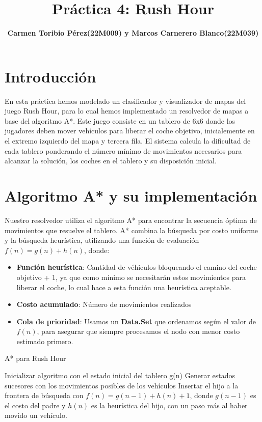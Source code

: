 \documentclass{article}
\title{ \textbf{Práctica 4: Rush Hour} }
\author{ \textbf{Carmen Toribio Pérez(22M009) y Marcos Carnerero Blanco(22M039)} }
\date{}
\begin{document}
\maketitle

\section*{Introducción}
En esta práctica hemos modelado un clasificador y visualizador de mapas del juego Rush Hour, para lo cual hemos implementado un resolvedor de mapas a base del algoritmo A*. Este juego consiste en un tablero de 6x6 donde los jugadores deben mover vehículos para liberar el coche objetivo, inicialemente en el extremo izquierdo del mapa y tercera fila. El sistema calcula la dificultad de cada tablero ponderando el número mínimo de movimientos necesarios para alcanzar la solución, los coches en el tablero y su disposición inicial.

\section*{Algoritmo A* y su implementación}
Nuestro resolvedor utiliza el algoritmo A* para encontrar la secuencia óptima de movimientos que resuelve el tablero. A* combina la búsqueda por costo uniforme y la búsqueda heurística, utilizando una función de evaluación $f(n) = g(n) + h(n)$, donde:
\begin{itemize}
\item \textbf{Función heurística}: Cantidad de véhiculos bloqueando el camino del coche objetivo + 1, ya que como mínimo se necesitarán estos movimientos para liberar el coche, lo cual hace a esta función una heurística aceptable.
\item \textbf{Costo acumulado}: Número de movimientos realizados
\item \textbf{Cola de prioridad}: Usamos un \textbf{Data.Set} que ordenamos según el valor de $f(n)$, para asegurar que siempre procesamos el nodo con menor costo estimado primero.
\end{itemize}

\begin{algorithm}
\caption{A* para Rush Hour}
\begin{algorithmic}[]
\State Inicializar algoritmo con el estado inicial del tablero
        \State \Return g(n)
    \EndIf
        \State Generar estados sucesores con los movimientos posibles de los vehículos
            \State Insertar el hijo a la frontera de búsqueda con $f(n) = g(n - 1) + h(n) + 1$, donde $g(n - 1)$ es el costo del padre y $h(n)$ es la heurística del hijo, con un paso más al haber movido un vehículo.
        \EndIf
    \EndFor
\EndWhile
\end{algorithmic}
\end{algorithm}
\end{document}

